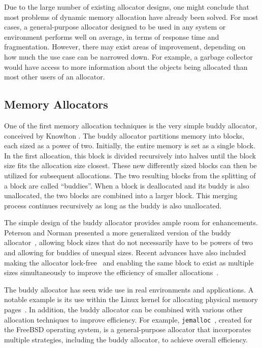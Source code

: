 Due to the large number of existing allocator designs, one might conclude that most problems of dynamic memory allocation have already been solved. For most cases, a general-purpose allocator designed to be used in any system or environment performs well on average, in terms of response time and fragmentation. However, there may exist areas of improvement, depending on how much the use case can be narrowed down. For example, a garbage collector would have access to more information about the objects being allocated than most other users of an allocator.

\subsection{Memory Allocators}

One of the first memory allocation techniques is the very simple buddy allocator, conceived by Knowlton \cite{buddy}. The buddy allocator partitions memory into blocks, each sized as a power of two. Initially, the entire memory is set as a single block. In the first allocation, this block is divided recursively into halves until the block size fits the allocation size closest. These new differently sized blocks can then be utilized for subsequent allocations. The two resulting blocks from the splitting of a block are called ``buddies''. When a block is deallocated and its buddy is also unallocated, the two blocks are combined into a larger block. This merging process continues recursively as long as the buddy is also unallocated.

The simple design of the buddy allocator provides ample room for enhancements. Peterson and Norman presented a more generalized version of the buddy allocator~\cite{genbuddy}, allowing block sizes that do not necessarily have to be powers of two and allowing for buddies of unequal sizes. Recent advances have also included making the allocator lock-free~\cite{nbbs} and enabling the same block to exist as multiple sizes simultaneously to improve the efficiency of smaller allocations~\cite{park2014ibuddy}.

The buddy allocator has seen wide use in real environments and applications. A notable example is its use within the Linux kernel for allocating physical memory pages~\cite{linuxbuddy}. In addition, the buddy allocator can be combined with various other allocation techniques to improve efficiency. For example, \texttt{jemalloc}~\cite{jemalloc}, created for the FreeBSD operating system, is a general-purpose allocator that incorporates multiple strategies, including the buddy allocator, to achieve overall efficiency.

